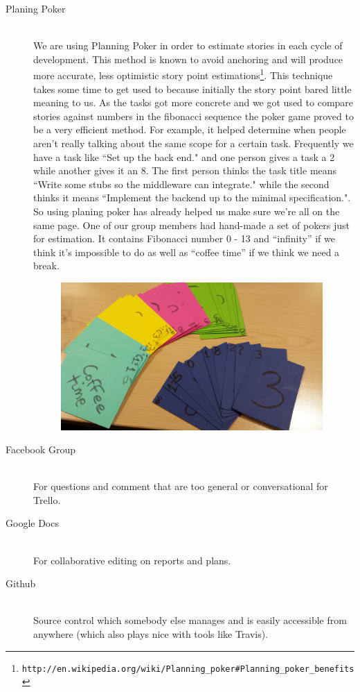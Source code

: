 \documentclass[11pt]{article}
\begin{document}
\begin{description}
\begin{figure}[h!]
\end{figure}
  \item[Planing Poker] \hfill \\
We are using Planning Poker in order to estimate stories in each cycle of development. This method is known to avoid anchoring and will produce more accurate, less optimistic story point estimations\footnote{\tt{http://en.wikipedia.org/wiki/Planning\_poker\#Planning\_poker\_benefits}}. This technique takes some time to get used to because initially the story point bared little meaning to us. As the tasks got more concrete and we got used to compare stories against numbers in the fibonacci sequence the poker game proved to be a very efficient method. 
For example, it helped determine when people aren't really talking about the same scope for a certain task. Frequently we have a task like ``Set up the back end." and one person gives a task a 2 while another gives it an 8. The first person thinks the task title means ``Write some stubs so the middleware can integrate." while the second thinks it means ``Implement the backend up to the minimal specification.". So using planing poker has already helped us make sure we're all on the same page. One of our group members had hand-made a set of pokers just for estimation. It contains Fibonacci number 0 - 13 and ``infinity'' if we think it's impossible to do as well as ``coffee time'' if we think we need a break. 
\begin{figure}[h!]
\centering
\includegraphics[width=100mm]{planningPokers.jpg}
\end{figure}  
  \item[Facebook Group] \hfill \\
  For questions and comment that are too general or conversational for Trello.
  \item[Google Docs] \hfill \\
  For collaborative editing on reports and plans.
  \item[Github] \hfill \\
  Source control which somebody else manages and is easily accessible from anywhere
  (which also plays nice with tools like Travis).


\end{description}
\end{document}
